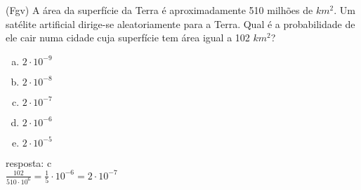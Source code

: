 \begin{ex}
(Fgv) A área da superfície da Terra é aproximadamente 510 milhões de $km^2$. Um satélite artificial dirige-se aleatoriamente para a Terra. Qual é a probabilidade de ele cair numa cidade cuja superfície tem área igual a 102 $km^2$?
   \begin{enumerate}[(a)]
   \item $2\cdot {10}^{-9}$
   \item $2\cdot {10}^{-8}$
   \item $2\cdot {10}^{-7}$
   \item $2\cdot {10}^{-6}$
   \item $2\cdot {10}^{-5}$
   \end{enumerate}
     \begin{sol}
      resposta: c \\
      $\frac{102}{510\cdot 10^6}=\frac{1}{5}\cdot10^{-6}=2\cdot10^{-7}$
     \end{sol}
\end{ex}